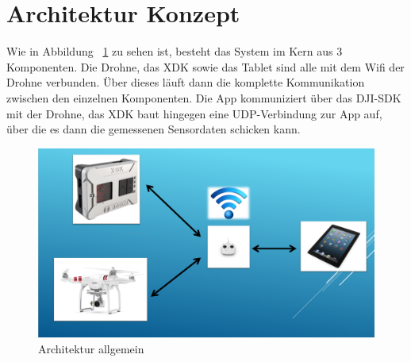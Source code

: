 \section{Architektur Konzept}\label{sec:Architektur Konzept}
Wie in Abbildung ~\ref{fig:Architektur_grob} zu sehen ist, besteht das System im Kern aus 3 Komponenten. Die Drohne, das \acs{XDK} sowie das Tablet sind alle mit dem Wifi der Drohne verbunden. Über dieses läuft dann die komplette Kommunikation zwischen den einzelnen Komponenten. Die App kommuniziert über das \acs{DJI}-\acs{SDK} mit der Drohne, das XDK baut hingegen eine UDP-Verbindung zur App auf, über die es dann die gemessenen Sensordaten schicken kann.
\begin{figure}[H]
	\includegraphics[width=\textwidth]{images/Architektur_grob.png}	
	\caption{Architektur allgemein}
	\label{fig:Architektur_grob}
\end{figure}

